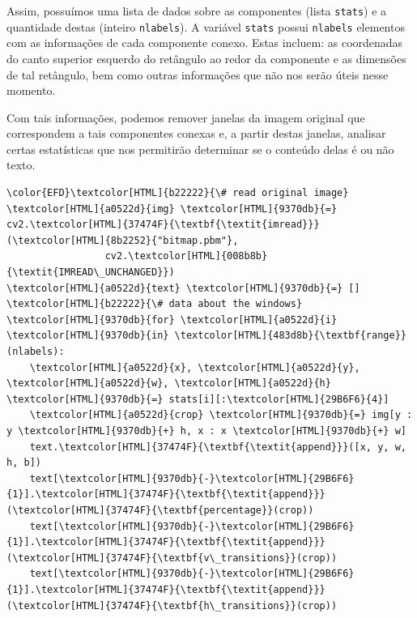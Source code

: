 \documentclass[twocolumn, 10pt]{article}
\begin{document}
Assim, possuímos uma lista de dados sobre as componentes (lista \texttt{stats}) e a quantidade destas (inteiro \texttt{nlabels}).
A variável \texttt{stats} possui \texttt{nlabels} elementos com as informações de cada componente conexo.
Estas incluem: as coordenadas do canto superior esquerdo do retângulo ao redor da componente e as dimensões de tal retângulo, bem como outras informações que não nos serão úteis nesse momento.

Com tais informações, podemos remover janelas da imagem original que correspondem a tais componentes conexas e, a partir destas janelas, analisar certas estatísticas que nos permitirão determinar se o conteúdo delas é ou não texto.

\begin{Code}
\begin{Verbatim}
\color{EFD}\textcolor[HTML]{b22222}{\# read original image}
\textcolor[HTML]{a0522d}{img} \textcolor[HTML]{9370db}{=} cv2.\textcolor[HTML]{37474F}{\textbf{\textit{imread}}}(\textcolor[HTML]{8b2252}{"bitmap.pbm"},
                 cv2.\textcolor[HTML]{008b8b}{\textit{IMREAD\_UNCHANGED}})
\textcolor[HTML]{a0522d}{text} \textcolor[HTML]{9370db}{=} [] \textcolor[HTML]{b22222}{\# data about the windows}
\textcolor[HTML]{9370db}{for} \textcolor[HTML]{a0522d}{i} \textcolor[HTML]{9370db}{in} \textcolor[HTML]{483d8b}{\textbf{range}}(nlabels):
    \textcolor[HTML]{a0522d}{x}, \textcolor[HTML]{a0522d}{y}, \textcolor[HTML]{a0522d}{w}, \textcolor[HTML]{a0522d}{h} \textcolor[HTML]{9370db}{=} stats[i][:\textcolor[HTML]{29B6F6}{4}]
    \textcolor[HTML]{a0522d}{crop} \textcolor[HTML]{9370db}{=} img[y : y \textcolor[HTML]{9370db}{+} h, x : x \textcolor[HTML]{9370db}{+} w]
    text.\textcolor[HTML]{37474F}{\textbf{\textit{append}}}([x, y, w, h, b])
    text[\textcolor[HTML]{9370db}{-}\textcolor[HTML]{29B6F6}{1}].\textcolor[HTML]{37474F}{\textbf{\textit{append}}}(\textcolor[HTML]{37474F}{\textbf{percentage}}(crop))
    text[\textcolor[HTML]{9370db}{-}\textcolor[HTML]{29B6F6}{1}].\textcolor[HTML]{37474F}{\textbf{\textit{append}}}(\textcolor[HTML]{37474F}{\textbf{v\_transitions}}(crop))
    text[\textcolor[HTML]{9370db}{-}\textcolor[HTML]{29B6F6}{1}].\textcolor[HTML]{37474F}{\textbf{\textit{append}}}(\textcolor[HTML]{37474F}{\textbf{h\_transitions}}(crop))
\end{Verbatim}
\end{Code}
\end{document}
